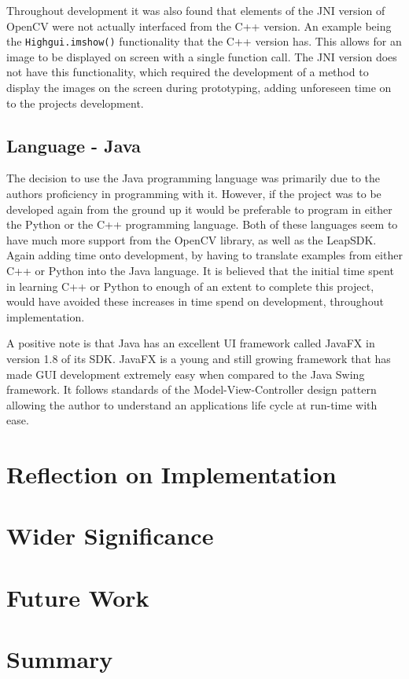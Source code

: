 \documentclass[11pt,oneside]{report}
\newcommand\code[1]{\texttt{#1}}
\begin{document}
			Throughout development it was also found that elements of the JNI version of OpenCV were not actually interfaced from the C++ version.
			An example being the \code{Highgui.imshow()} functionality that the C++ version has.
			This allows for an image to be displayed on screen with a single function call.
			The JNI version does not have this functionality, which required the development of a method to display the images on the screen during prototyping, adding unforeseen time on to the projects development.
		\subsection{Language - Java}
			The decision to use the Java programming language was primarily due to the authors proficiency in programming with it.
			However, if the project was to be developed again from the ground up it would be preferable to program in either the Python or the C++ programming language.
			Both of these languages seem to have much more support from the OpenCV library, as well as the LeapSDK.
			Again adding time onto development, by having to translate examples from either C++ or Python into the Java language.
			It is believed that the initial time spent in learning C++ or Python to enough of an extent to complete this project, would have avoided these increases in time spend on development, throughout implementation.
			
			A positive note is that Java has an excellent UI framework called JavaFX in version 1.8 of its SDK.
			JavaFX is a young and still growing framework that has made GUI development extremely easy when compared to the Java Swing framework.
			It follows standards of the Model-View-Controller design pattern allowing the author to understand an applications life cycle at run-time with ease.
	\section{Reflection on Implementation}
	\section{Wider Significance}
	\section{Future Work}
	
	\section{Summary}
	
\end{document}
